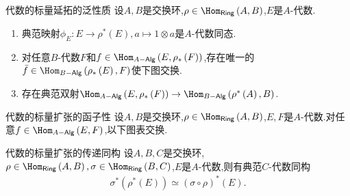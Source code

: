 \begin{proposition}{代数的标量延拓的泛性质}{}
	设$A,B$是交换环,$\rho\in\Hom_{\mathsf{Ring}}\left(A,B\right)$,$E$是$A$-代数.
	\begin{enumerate}
		\item 典范映射$\phi_{E}:E\to\rho^{\ast}\left(E\right),a\mapsto 1\otimes a$是$A$-代数同态.
		\item 对任意$B$-代数$F$和$f\in\Hom_{A-\mathsf{Alg}}\left(E,\rho_{\ast}\left(F\right)\right)$,存在唯一的$\bar{f}\in\Hom_{B-\mathsf{Alg}}\left(\rho_{\ast}\left(E\right),F\right)$使下图交换.
		\begin{center}
		\end{center}
		\item 存在典范双射$\Hom_{A-\mathsf{Alg}}\left(E,\rho_{\ast}\left(F\right)\right)\to\Hom_{B-\mathsf{Alg}}\left(\rho^{\ast}\left(A\right),B\right)$.
	\end{enumerate}
\end{proposition}

\begin{corollary}{代数的标量扩张的函子性}{}
	设$A,B$是交换环,$\rho\in\Hom_{\mathsf{Ring}}\left(A,B\right)$,$E,F$是$A$-代数.对任意$f\in\Hom_{A-\mathsf{Alg}}\left(E,F\right)$,以下图表交换.
	\begin{center}
	\end{center}
\end{corollary}

\begin{proposition}{代数的标量扩张的传递同构}{}
	设$A,B,C$是交换环,$\rho\in\Hom_{\mathsf{Ring}}\left(A,B\right),\sigma\in\Hom_{\mathsf{Ring}}\left(B,C\right)$,$E$是$A$-代数,则有典范$C$-代数同构
	\begin{align*}
		\sigma^{\ast}\left(\rho^{\ast}\left(E\right)\right)\simeq\left(\sigma\circ\rho\right)^{\ast}\left(E\right).
	\end{align*}
\end{proposition}











